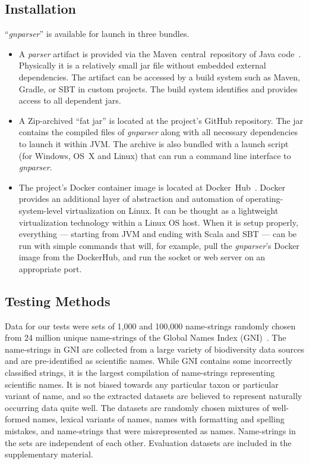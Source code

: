 \documentclass{bmcart}
\begin{document}
\subsection*{Installation}

``\textit{gnparser}'' is available for launch in three bundles.

\begin{itemize} \item A \textit{parser} artifact is provided via the Maven~central~repository of Java code~\cite{maven-globalnames}. Physically it is a relatively small jar file without embedded external dependencies. The artifact can be accessed by a build system such as Maven, Gradle, or SBT in custom projects. The build system identifies and provides access to all dependent jars.

  \item A Zip-archived ``fat jar'' is located at the project's GitHub repository. The jar contains the compiled files of \textit{gnparser} along with all necessary dependencies to launch it within JVM\@. The archive is also bundled with a launch script (for Windows, OS~X and Linux) that can run a command line interface to \textit{gnparser}.

  \item The project's Docker container image is located at Docker~Hub~\cite{gnparser-docker}. Docker provides an additional layer of abstraction and automation of operating-system-level virtualization on Linux. It can be thought as a lightweight virtualization technology within a Linux OS host.  When it is setup properly, everything --- starting from JVM and ending with Scala and SBT --- can be run with simple commands that will, for example, pull the \textit{gnparser}'s Docker image from the DockerHub, and run the socket or web server on an appropriate port.

\end{itemize}

\subsection*{Testing Methods}

Data for our tests were sets of 1,000 and 100,000 name-strings randomly chosen from 24 million unique name-strings of the Global Names Index (GNI)~\cite{gn:index}. The name-strings in GNI are collected from a large variety of biodiversity data sources and are pre-identified as scientific names. While GNI contains some incorrectly classified strings, it is the largest compilation of name-strings representing scientific names. It is not biased towards any particular taxon or particular variant of name, and so the extracted datasets are believed to represent naturally occurring data quite well. The datasets are randomly chosen mixtures of well-formed names, lexical variants of names, names with formatting and spelling mistakes, and name-strings that were misrepresented as names. Name-strings in the sets are independent of each other. Evaluation datasets are included in the supplementary material.
\end{document}
